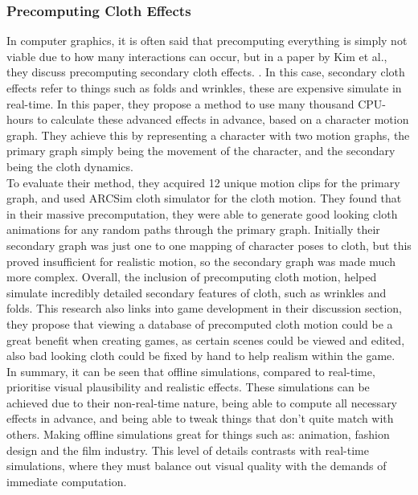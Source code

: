 \documentclass[12pt,a4paper]{article}
\begin{document}
\subsubsection{Precomputing Cloth Effects}
In computer graphics, it is often said that precomputing everything is simply not viable due to how many interactions can occur, but in a paper by Kim et al., they discuss precomputing secondary cloth effects. \cite{kim2013near}. In this case, secondary cloth effects refer to things such as folds and wrinkles, these are expensive simulate in real-time. In this paper, they propose a method to use many thousand CPU-hours to calculate these advanced effects in advance, based on a character motion graph. They achieve this by representing a character with two motion graphs, the primary graph simply being the movement of the character, and the secondary being the cloth dynamics. \\

To evaluate their method, they acquired 12 unique motion clips for the primary graph, and used ARCSim cloth simulator for the cloth motion. They found that in their massive precomputation, they were able to generate good looking cloth animations for any random paths through the primary graph. Initially their secondary graph was just one to one mapping of character poses to cloth, but this proved insufficient for realistic motion, so the secondary graph was made much more complex. 
Overall, the inclusion of precomputing cloth motion, helped simulate incredibly detailed secondary features of cloth, such as wrinkles and folds. This research also links into game development in their discussion section, they propose that viewing a database of precomputed cloth motion could be a great benefit when creating games, as certain scenes could be viewed and edited, also bad looking cloth could be fixed by hand to help realism within the game. \\

In summary, it can be seen that offline simulations, compared to real-time, prioritise visual plausibility and realistic effects. These simulations can be achieved due to their non-real-time nature, being able to compute all necessary effects in advance, and being able to tweak things that don't quite match with others. Making offline simulations great for things such as: animation, fashion design and the film industry. This level of details contrasts with real-time simulations, where they must balance out visual quality with the demands of immediate computation.
\end{document}
